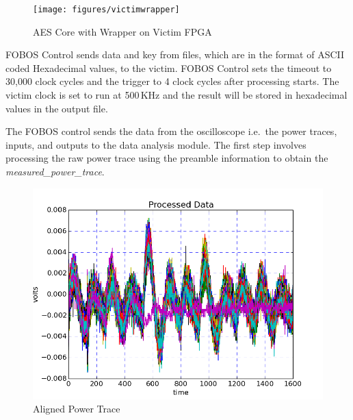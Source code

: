 \begin{figure}[ht]
\begin{center}
\texttt{[image: figures/victimwrapper]}
\caption{\label{fig:fobos-vicaes128}AES Core with Wrapper on Victim FPGA}
\end{center} 
\vspace{-3ex}
\end{figure}

FOBOS Control sends data and key from files, which are in
the format of ASCII coded Hexadecimal values, to the victim. FOBOS Control sets the timeout
to 30,000 clock cycles and the trigger to 4 clock cycles after processing starts.
The victim clock is set to run at 500\,KHz and the result will be 
stored in hexadecimal values in the output file.

The FOBOS control sends the data from the oscilloscope i.e.\ the power traces, inputs, and outputs to
the data analysis module. The first step involves processing the raw 
power trace using the preamble information to obtain the \emph{measured\_power\_trace}.

\begin{figure}[H]
\begin{center}
\includegraphics[scale=0.8]{figures/scaTrace1}
\caption{\label{fig:alpt}Aligned Power Trace}
\end{center} 
\vspace{-3ex}
\end{figure}

